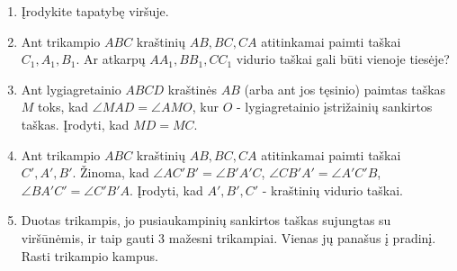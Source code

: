 \begin{enumerate} 
\item Įrodykite tapatybę viršuje.
\item Ant trikampio $ABC$ kraštinių $AB, BC, CA$ atitinkamai paimti taškai
  $C_1, A_1, B_1$. Ar atkarpų $AA_1, BB_1, CC_1$ vidurio taškai gali būti
  vienoje tiesėje? 
\item  Ant lygiagretainio $ABCD$ kraštinės $AB$ (arba ant jos tęsinio)
  paimtas taškas $M$ toks, kad $\angle MAD = \angle AMO$, kur $O$ -
  lygiagretainio įstrižainių sankirtos taškas. Įrodyti, kad $MD=MC$. 
\item Ant trikampio $ABC$ kraštinių $AB, BC, CA$ atitinkamai paimti taškai
  $C', A', B'$. Žinoma, kad $\angle AC'B' = \angle B'A'C$, $\angle CB'A' =
  \angle A'C'B$, $\angle BA'C' = \angle C'B'A$. Įrodyti, kad $A', B', C'$ -
  kraštinių vidurio taškai.
\item Duotas trikampis, jo pusiaukampinių sankirtos taškas sujungtas su
  viršūnėmis, ir taip gauti 3 mažesni trikampiai. Vienas jų panašus į
  pradinį.  Rasti trikampio kampus.

\end{enumerate}
